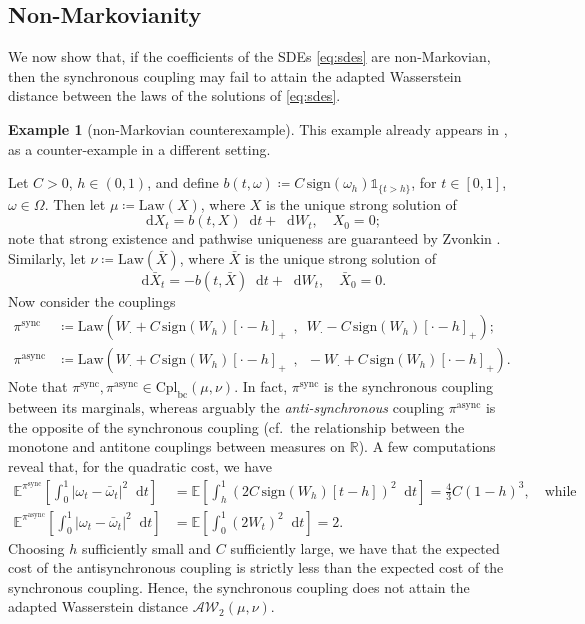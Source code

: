\documentclass[oneside]{amsart}
\theoremstyle{definition}
\newtheorem{example}[theorem]{Example}
\newcommand{\AW}{\mathcal A\mathcal W}
\newcommand{\Law}{\mathrm{Law}}
\newcommand{\R}{\mathbb R}
\newcommand{\cpl}{\mathrm{Cpl}}
\newcommand{\cplba}{\cpl_{\mathrm{bc}}}
\newcommand{\sync}{\mathrm{sync}}
\newcommand{\async}{\mathrm{async}}
\newcommand{\D}{\mathop{}\!\mathrm{d}}
\newcommand{\dt}{\mathop{}\!\mathrm{d}t}
\newcommand{\di}{\mathop{}\!\mathrm{d}}
\def\E{{\mathbb E}}
\def\R{{\mathbb R}}
\numberwithin{equation}{section}
\begin{document}
	\subsection{Non-Markovianity}

	We now show that, if the coefficients of the SDEs \eqref{eq:sdes} are non-Markovian, then the synchronous coupling may fail to attain the adapted Wasserstein distance between the laws of the solutions of \eqref{eq:sdes}. 
	

	\begin{example}[non-Markovian counterexample]\label{ex:non-M}
	This example already appears in \cite{BaBaBeEd19a}, as a counter-example in a different setting.
	 
		Let $C>0$, $h\in(0,1)$, and define $b(t, \omega) \coloneqq  C \, \text{sign}(\omega_h)\mathds{1}_{\{t>h\}}$, for $t \in [0, 1]$, $\omega \in \Omega$. Then let $\mu \coloneqq \Law(X)$, where $X$ is the unique strong solution of
		\begin{equation}
		\di X_t=b(t, X)\dt+\di W_t,
		\quad X_0=0;
	\end{equation}
	note that strong existence and pathwise uniqueness are guaranteed by Zvonkin \cite{Zv74}. Similarly, let $\nu \coloneqq \Law(\bar X)$, where $\bar X$ is the unique strong solution of
		\begin{equation}
		\di \bar X_t=-b(t, \bar X)\dt+\di W_t,
		\quad \bar X_0=0.
	\end{equation}
	Now consider the couplings
	\begin{align}
		\pi^\sync& \coloneqq \Law\!\left (W_\cdot + C\, \text{sign}(W_h) [\cdot-h]_+\,\,\, , \,\,\,  W_\cdot- C\, \text{sign}(W_h) [\cdot-h]_+ \right ); \\
		\pi^\async& \coloneqq \Law\!\left (W_\cdot + C\, \text{sign}(W_h) [\cdot-h]_+\,\,\, , \,\,\,  -W_\cdot + C\, \text{sign}(W_h) [\cdot-h]_+ \right ).
	\end{align}
	Note that $\pi^\sync, \pi^\async \in \cplba(\mu, \nu)$. In fact, $\pi^\sync$ is the synchronous coupling between its marginals, whereas arguably the \emph{anti-synchronous} coupling $\pi^\async$ is the opposite of the synchronous coupling (cf.\ the relationship between the monotone and antitone couplings between measures on $\R$). A few computations reveal that, for the quadratic cost, we have
	\begin{align}
		\E^{\pi^\sync}\!\left[\int_0^1 | \omega_t - \bar \omega_t|^2 \D t\right]&=\E\!\left[\int_h^1(2C\, \text{sign}(W_h)[t-h])^2\di t\right] = \frac{4}{3}C(1-h)^3, \quad \text{while}\\
		\E^{\pi^\async}\!\left[\int_0^1 | \omega_t - \bar \omega_t|^2 \D t\right]&=\E\!\left[\int_0^1(2W_t)^2\di t\right] = 2.
	\end{align}
	Choosing $h$ sufficiently small and $C$ sufficiently large, we have that the expected cost of the antisynchronous coupling is strictly less than the expected cost of the synchronous coupling. Hence, the synchronous coupling does not attain the adapted Wasserstein distance $\AW_2(\mu, \nu)$.
	\end{example}
	
\end{document}
